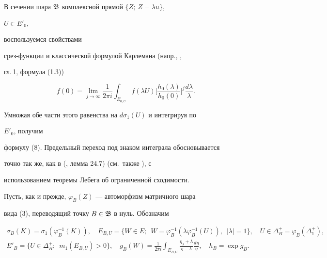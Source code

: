 \begin{pf} 


В сечении шара $\frak B$ комплексной прямой $\{Z;\ Z=\lambda u\}$, 


$U\in E'_0$, 


воспользуемся свойствами 


срез-функции и классической формулой Карлемана (напр., \cite{1}, 


гл.\,1, формула (1.3)) 


$$ 


f(0)=\lim_{j\to\infty}\frac{1}{2\pi i}\int_{E_{0,U}} 


f(\lambda U)\bigg[\frac{h_0(\lambda)}{h_0(0)}\bigg]^j 


\frac{d\lambda}{\lambda}. 


$$ 


Умножая обе части этого равенства на $d\sigma_1(U)$ и интегрируя по 


$E'_0$, получим 


формулу (8). Предельный переход под знаком интеграла обосновывается 


точно так же, как в (\cite{1}, лемма 24.7) (см.~также \cite{6}), с 


использованием теоремы Лебега об ограниченной сходимости. 


\end{pf} 


 


Пусть, как и прежде, $\varphi_B(Z)$ --- автоморфизм матричного шара 


вида (3), переводящий точку $B\in\frak B$ в нуль. Обозначим 


\begin{gather*} 


\sigma_B(K)=\sigma_1(\varphi^{-1}_B(K)),\quad 


E_{B,U}=\{W\in E;\ \;W=\varphi^{-1}_B(\lambda\varphi^{-1}_B(U)), 


\ \;|\lambda|=1\},\quad 


U\in\Delta^+_B=\varphi_B(\Delta^+_1),\\ 


%


E'_B=\{U\in\Delta^+_B;\ \; m_1(E_{B,U})>0\},\quad 


g_B(W)=\frac{1}{2\pi i}\int_{E_{B,U}} 


\frac{\eta_\lambda+\lambda}{\eta-\lambda}\frac{d\eta}{\eta},\quad 


h_B=\exp g_B. 


\end{gather*} 


